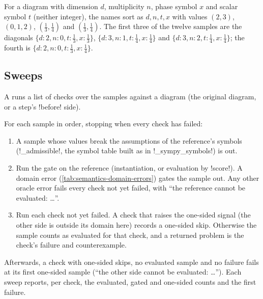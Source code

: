 \begin{example}
For a diagram with dimension $d$, multiplicity $n$, phase symbol $x$ and scalar symbol $t$ (neither integer), the names sort as $d,n,t,x$ with values $(2,3)$, $(0,1,2)$, $(\tfrac13,\tfrac14)$ and $(\tfrac13,\tfrac14)$. The first three of the twelve samples are the diagonals $\{d{:}2,n{:}0,t{:}\tfrac13,x{:}\tfrac13\}$, $\{d{:}3,n{:}1,t{:}\tfrac14,x{:}\tfrac14\}$ and $\{d{:}3,n{:}2,t{:}\tfrac14,x{:}\tfrac14\}$; the fourth is $\{d{:}2,n{:}0,t{:}\tfrac13,x{:}\tfrac14\}$.
\end{example}

\subsection{Sweeps}

A  runs a list of checks over the samples against a  diagram (the original diagram, or a step's \code!before! side).

\begin{algorithm}\label{alg:semantics-sweep}
For each sample in order, stopping when every check has failed:
\begin{enumerate}
\item A sample whose values break the assumptions of the reference's symbols (\py!_admissible!, the symbol table built as in \py!_sympy_symbols!) is  out.
\item Run the gate on the reference (instantiation, or evaluation by \py!score!). A domain error (\cref{tab:semantics-domain-errors}) gates the sample out. Any other oracle error fails every check not yet failed, with ``the reference cannot be evaluated: \ldots''.
\item Run each check not yet failed. A check that raises the one-sided signal (the other side is outside its domain here) records a one-sided skip. Otherwise the sample counts as evaluated for that check, and a returned problem is the check's failure and counterexample.
\end{enumerate}
Afterwards, a check with one-sided skips, no evaluated sample and no failure fails at its first one-sided sample (``the other side cannot be evaluated: \ldots''). Each sweep reports, per check, the evaluated, gated and one-sided counts and the first failure.
\end{algorithm}

